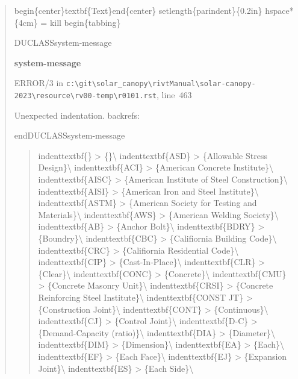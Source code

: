 \documentclass[12pt,notitle,letterpaper]{report}
\newenvironment{DUclass}[1]%
  {%
   \def\DocutilsClassFunctionName{DUCLASS#1}
     \csname \DocutilsClassFunctionName \endcsname}%
  {\csname end\DocutilsClassFunctionName \endcsname}%
\newenvironment{DUadmonition}%
  {\begin{center}
     \begin{lrbox}{\DUadmonitionbox}
       \begin{minipage}{0.9\linewidth}
  }%
  {    \end{minipage}
     \end{lrbox}
     \fbox{\usebox{\DUadmonitionbox}}
   \end{center}
  }
\providecommand*{\DUtitle}[1]{%
  \smallskip\noindent\textbf{#1}\smallskip}
\begin{document}
\begin{quote}
begin\{center\}textbf\{Text\}end\{center\}
setlength\{parindent\}\{0.2in\}
hspace*\{4cm\} = kill
begin\{tabbing\}

\begin{DUclass}{system-message}
\begin{DUadmonition}
\DUtitle{system-message
}

{\color{red}ERROR/3} in \texttt{c:\textbackslash{}git\textbackslash{}solar\_canopy\textbackslash{}rivtManual\textbackslash{}solar-canopy-2023\textbackslash{}resource\textbackslash{}rv00-temp\textbackslash{}r0101.rst}, line~463

Unexpected indentation.
backrefs: \end{DUadmonition}
\end{DUclass}

\begin{quote}
indenttextbf\{\}         >  \{\}\textbackslash{}
indenttextbf\{ASD\}      >  \{Allowable Stress Design\}\textbackslash{}
indenttextbf\{ACI\}      >  \{American Concrete Institute\}\textbackslash{}
indenttextbf\{AISC\}     >  \{American Institute of Steel Construction\}\textbackslash{}
indenttextbf\{AISI\}     >  \{American Iron and Steel Institute\}\textbackslash{}
indenttextbf\{ASTM\}     >  \{American Society for Testing and Materials\}\textbackslash{}
indenttextbf\{AWS\}      >  \{American Welding Society\}\textbackslash{}
indenttextbf\{AB\}       >  \{Anchor Bolt\}\textbackslash{}
indenttextbf\{BDRY\}     >  \{Boundry\}\textbackslash{}
indenttextbf\{CBC\}      >  \{Califiornia Building Code\}\textbackslash{}
indenttextbf\{CRC\}      >  \{Califiornia Residential Code\}\textbackslash{}
indenttextbf\{CIP\}      >  \{Cast-In-Place\}\textbackslash{}
indenttextbf\{CLR\}      >  \{Clear\}\textbackslash{}
indenttextbf\{CONC\}     >  \{Concrete\}\textbackslash{}
indenttextbf\{CMU\}      >  \{Concrete Masonry Unit\}\textbackslash{}
indenttextbf\{CRSI\}     >  \{Concrete Reinforcing Steel Institute\}\textbackslash{}
indenttextbf\{CONST JT\} >  \{Construction Joint\}\textbackslash{}
indenttextbf\{CONT\}     >  \{Continuous\}\textbackslash{}
indenttextbf\{CJ\}       >  \{Control Joint\}\textbackslash{}
indenttextbf\{D-C\}      >  \{Demand-Capacity (ratio)\}\textbackslash{}
indenttextbf\{DIA\}      >  \{Diameter\}\textbackslash{}
indenttextbf\{DIM\}      >  \{Dimension\}\textbackslash{}
indenttextbf\{EA\}       >  \{Each\}\textbackslash{}
indenttextbf\{EF\}       >  \{Each Face\}\textbackslash{}
indenttextbf\{EJ\}       >  \{Expansion Joint\}\textbackslash{}
indenttextbf\{ES\}       >  \{Each Side\}\textbackslash{}

\end{quote}
\end{quote}
\end{document}
